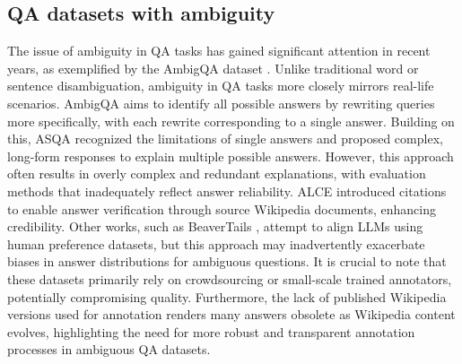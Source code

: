 \label{sec:related_work}

\subsection{QA datasets with ambiguity}
The issue of ambiguity in QA tasks has gained significant attention in recent years, as exemplified by the AmbigQA dataset \cite{min-etal-2020-ambigqa}. Unlike traditional word or sentence disambiguation, ambiguity in QA tasks more closely mirrors real-life scenarios. AmbigQA aims to identify all possible answers by rewriting queries more specifically, with each rewrite corresponding to a single answer. Building on this, ASQA \cite{stelmakh-etal-2022-asqa} recognized the limitations of single answers and proposed complex, long-form responses to explain multiple possible answers. However, this approach often results in overly complex and redundant explanations, with evaluation methods that inadequately reflect answer reliability. ALCE \cite{gao-etal-2023-enabling} introduced citations to enable answer verification through source Wikipedia documents, enhancing credibility. Other works, such as BeaverTails \cite{ji2024beavertails}, attempt to align LLMs using human preference datasets, but this approach may inadvertently exacerbate biases in answer distributions for ambiguous questions. It is crucial to note that these datasets primarily rely on crowdsourcing or small-scale trained annotators, potentially compromising quality. Furthermore, the lack of published Wikipedia versions used for annotation renders many answers obsolete as Wikipedia content evolves, highlighting the need for more robust and transparent annotation processes in ambiguous QA datasets.


